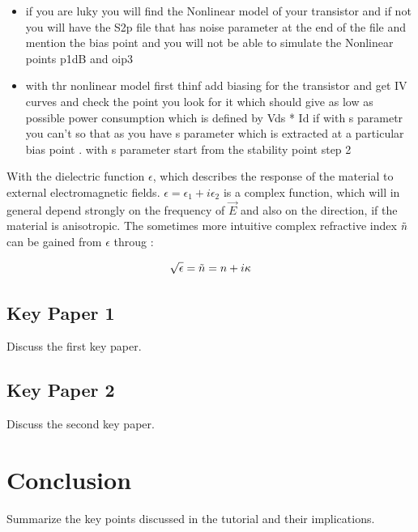 \documentclass{article}
\begin{document}
\begin{itemize}
\item  if  you are luky you will find the Nonlinear model of your transistor and if not you will have the S2p file that has noise parameter 
at the end of the file and mention the bias point and you will not be able to simulate the Nonlinear points p1dB and oip3 
\item with thr nonlinear model first thinf add biasing for the transistor and get IV curves and check the point you look for it which 
should give as low as possible power consumption which is defined by Vds * Id 
if with s parametr you can't so that as you  have s parameter which is extracted at a  particular bias point .
with s parameter start from the stability point step 2 



\end{itemize}

With the dielectric function $\epsilon$, which describes the response of the material to external electromagnetic fields. $\epsilon = \epsilon_1 + i \epsilon_2$ is a complex function, which will in general depend strongly on the frequency of $\Vec{E}$ and also on the direction, if the material is anisotropic. The sometimes more intuitive complex refractive index $\Tilde{n}$ can be gained from $\epsilon$ throug \cite{paper_2}:

\begin{equation}
    \sqrt{\epsilon} = \Tilde{n} = n + i\kappa
\end{equation}














\subsection{Key Paper 1}
Discuss the first key paper. \cite{author2021paper}

\subsection{Key Paper 2}
Discuss the second key paper. \cite{author2022paper}



\section{Conclusion}
Summarize the key points discussed in the tutorial and their implications.



\end{document}
